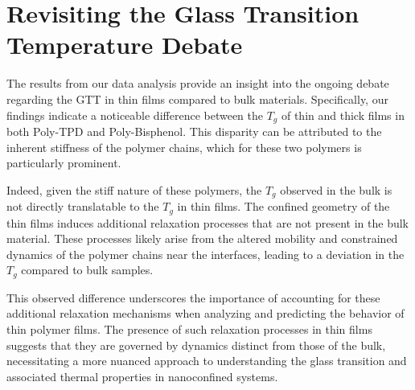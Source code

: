 \section{Revisiting the Glass Transition Temperature Debate}

The results from our data analysis provide an insight into the ongoing debate regarding the \ac{GTT} in thin films compared to bulk materials. Specifically, our findings indicate a noticeable difference between the \(T_g\) of thin and thick films in both Poly-TPD and Poly-Bisphenol. This disparity can be attributed to the inherent stiffness of the polymer chains, which for these two polymers is particularly prominent.

Indeed, given the stiff nature of these polymers, the \(T_g\) observed in the bulk is not directly translatable to the \(T_g\) in thin films. The confined geometry of the thin films induces additional relaxation processes that are not present in the bulk material. These processes likely arise from the altered mobility and constrained dynamics of the polymer chains near the interfaces, leading to a deviation in the \(T_g\) compared to bulk samples.

This observed difference underscores the importance of accounting for these additional relaxation mechanisms when analyzing and predicting the behavior of thin polymer films. The presence of such relaxation processes in thin films suggests that they are governed by dynamics distinct from those of the bulk, necessitating a more nuanced approach to understanding the glass transition and associated thermal properties in nanoconfined systems.
